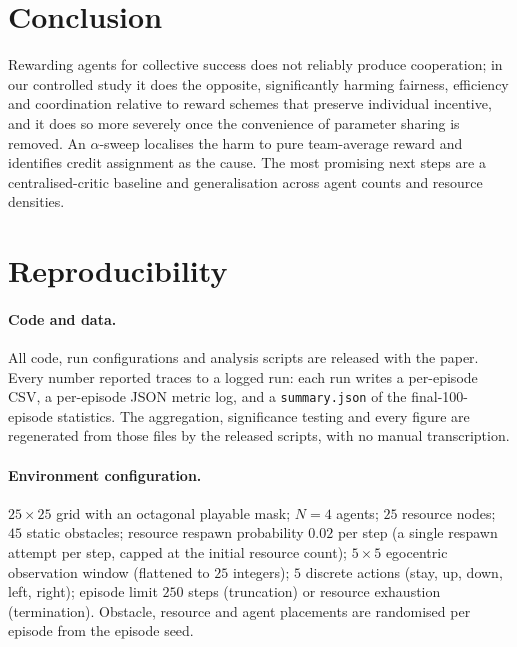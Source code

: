 \documentclass[sigconf,nonacm,anonymous,review]{acmart}
\begin{document}
\section{Conclusion}
Rewarding agents for collective success does not reliably produce cooperation; in our
controlled study it does the opposite, significantly harming fairness, efficiency and
coordination relative to reward schemes that preserve individual incentive, and it does so
more severely once the convenience of parameter sharing is removed. An $\alpha$-sweep
localises the harm to pure team-average reward and identifies credit assignment as the cause.
The most promising next steps are a centralised-critic baseline and generalisation across agent
counts and resource densities.




\appendix

\section{Reproducibility}
\label{app:repro}

\paragraph{Code and data.} All code, run configurations and analysis scripts are released with
the paper. Every number reported traces to a logged run: each run writes a per-episode CSV, a
per-episode JSON metric log, and a \texttt{summary.json} of the final-100-episode statistics.
The aggregation, significance testing and every figure are regenerated from those files by the
released scripts, with no manual transcription.

\paragraph{Environment configuration.} $25\times25$ grid with an octagonal playable mask;
$N=4$ agents; $25$ resource nodes; $45$ static obstacles; resource respawn probability
$0.02$ per step (a single respawn attempt per step, capped at the initial resource count);
$5\times5$ egocentric observation window (flattened to
$25$ integers); $5$ discrete actions (stay, up, down, left, right); episode limit $250$ steps
(truncation) or resource exhaustion (termination). Obstacle, resource and agent placements are
randomised per episode from the episode seed.
\end{document}
